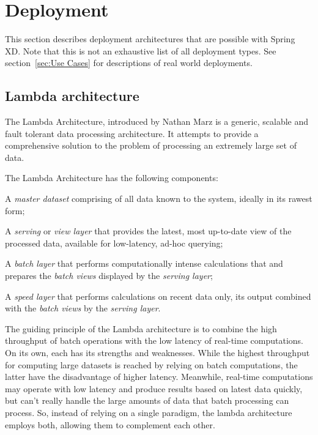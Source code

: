 \section{Deployment}
This section describes deployment architectures that are possible with Spring XD.
Note that this is not an exhaustive list of all deployment types. See
section~\ref{sec:Use Cases} for descriptions of real world deployments.

\subsection{Lambda architecture}

The Lambda Architecture, introduced by Nathan Marz \cite{lambda-architecture-paper}
is a generic, scalable and fault tolerant data  processing architecture. It 
attempts to provide a comprehensive solution to the problem of processing an 
extremely large set of data.

The Lambda Architecture has the following components:

\begin{itemize*}
\item A \emph{master dataset} comprising of all data known to the system,
ideally in its rawest form;
\item A \emph{serving} or \emph{view layer} that provides the latest,
most up-to-date view of the processed data, available for low-latency,
ad-hoc querying;
\item A \emph{batch layer} that performs computationally intense 
calculations that and prepares the \emph{batch views} displayed by the 
\emph{serving layer};
\item A \emph{speed layer} that performs calculations on recent data only, 
its output combined with the \emph{batch views} by the \emph{serving layer}.
\end{itemize*}

The guiding principle of the Lambda architecture is to combine the
high throughput of batch operations with the low latency of real-time
computations. On its own, each has its strengths and weaknesses. While the
highest throughput for computing large datasets is reached by relying on
batch computations, the latter have the disadvantage of higher latency.
Meanwhile, real-time computations may operate with low latency and produce
results based on latest data quickly, but can't really handle the large
amounts of data that batch processing can process. So, instead of relying
on a single paradigm, the lambda architecture employs both, allowing them
to complement each other.

